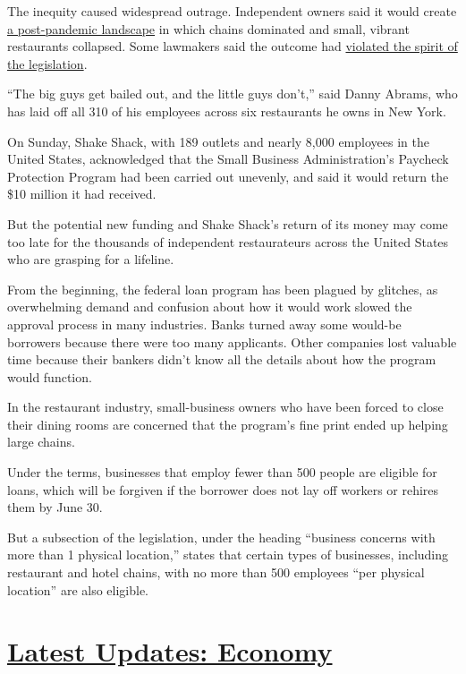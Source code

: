 The inequity caused widespread outrage. Independent owners said it would
create
\href{https://www.esquire.com/food-drink/restaurants/a32190986/cares-act-chains-independent-restaurants/}{a
post-pandemic landscape} in which chains dominated and small, vibrant
restaurants collapsed. Some lawmakers said the outcome had
\href{https://www.wsj.com/articles/how-ruths-chris-got-an-extra-helping-of-small-business-aid-money-11587312001}{violated
the spirit of the legislation}.

``The big guys get bailed out, and the little guys don't,'' said Danny
Abrams, who has laid off all 310 of his employees across six restaurants
he owns in New York.

On Sunday, Shake Shack, with 189 outlets and nearly 8,000 employees in
the United States, acknowledged that the Small Business Administration's
Paycheck Protection Program had been carried out unevenly, and said it
would return the \$10 million it had received.

But the potential new funding and Shake Shack's return of its money may
come too late for the thousands of independent restaurateurs across the
United States who are grasping for a lifeline.

From the beginning, the federal loan program has been plagued by
glitches, as overwhelming demand and confusion about how it would work
slowed the approval process in many industries. Banks turned away some
would-be borrowers because there were too many applicants. Other
companies lost valuable time because their bankers didn't know all the
details about how the program would function.

In the restaurant industry, small-business owners who have been forced
to close their dining rooms are concerned that the program's fine print
ended up helping large chains.

Under the terms, businesses that employ fewer than 500 people are
eligible for loans, which will be forgiven if the borrower does not lay
off workers or rehires them by June 30.

But a subsection of the legislation, under the heading ``business
concerns with more than 1 physical location,'' states that certain types
of businesses, including restaurant and hotel chains, with no more than
500 employees ``per physical location'' are also eligible.

\hypertarget{latest-updates-economy}{%
\section{\texorpdfstring{\href{https://www.nytimes.com/live/2020/08/03/business/stock-market-today-coronavirus?action=click\&pgtype=Article\&state=default\&region=MAIN_CONTENT_1\&context=storylines_live_updates}{Latest
Updates:
Economy}}{Latest Updates: Economy}}\label{latest-updates-economy}}

